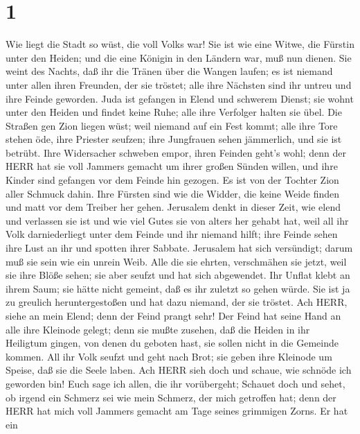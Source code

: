 \hypertarget{section}{%
\section{1}\label{section}}

 Wie liegt die Stadt so wüst, die voll Volks war! Sie ist
wie eine Witwe, die Fürstin unter den Heiden; und die eine Königin in
den Ländern war, muß nun dienen.  Sie weint des Nachts, daß
ihr die Tränen über die Wangen laufen; es ist niemand unter allen ihren
Freunden, der sie tröstet; alle ihre Nächsten sind ihr untreu und ihre
Feinde geworden.  Juda ist gefangen in Elend und schwerem
Dienst; sie wohnt unter den Heiden und findet keine Ruhe; alle ihre
Verfolger halten sie übel.  Die Straßen gen Zion liegen
wüst; weil niemand auf ein Fest kommt; alle ihre Tore stehen öde, ihre
Priester seufzen; ihre Jungfrauen sehen jämmerlich, und sie ist betrübt.
 Ihre Widersacher schweben empor, ihren Feinden geht's wohl;
denn der HERR hat sie voll Jammers gemacht um ihrer großen Sünden
willen, und ihre Kinder sind gefangen vor dem Feinde hin gezogen.
 Es ist von der Tochter Zion aller Schmuck dahin. Ihre
Fürsten sind wie die Widder, die keine Weide finden und matt vor dem
Treiber her gehen.  Jerusalem denkt in dieser Zeit, wie
elend und verlassen sie ist und wie viel Gutes sie von alters her gehabt
hat, weil all ihr Volk darniederliegt unter dem Feinde und ihr niemand
hilft; ihre Feinde sehen ihre Lust an ihr und spotten ihrer Sabbate.
 Jerusalem hat sich versündigt; darum muß sie sein wie ein
unrein Weib. Alle die sie ehrten, verschmähen sie jetzt, weil sie ihre
Blöße sehen; sie aber seufzt und hat sich abgewendet.  Ihr
Unflat klebt an ihrem Saum; sie hätte nicht gemeint, daß es ihr zuletzt
so gehen würde. Sie ist ja zu greulich heruntergestoßen und hat dazu
niemand, der sie tröstet. Ach HERR, siehe an mein Elend; denn der Feind
prangt sehr!  Der Feind hat seine Hand an alle ihre
Kleinode gelegt; denn sie mußte zusehen, daß die Heiden in ihr Heiligtum
gingen, von denen du geboten hast, sie sollen nicht in die Gemeinde
kommen.  All ihr Volk seufzt und geht nach Brot; sie geben
ihre Kleinode um Speise, daß sie die Seele laben. Ach HERR sieh doch und
schaue, wie schnöde ich geworden bin!  Euch sage ich allen,
die ihr vorübergeht; Schauet doch und sehet, ob irgend ein Schmerz sei
wie mein Schmerz, der mich getroffen hat; denn der HERR hat mich voll
Jammers gemacht am Tage seines grimmigen Zorns.  Er hat ein
